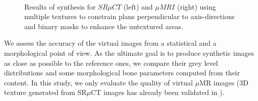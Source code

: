 \documentclass{article}
\begin{document}
\begin{figure}
 \vspace{-0.2cm}
 \centering
 \\
 \caption{Results of synthesis for $SR \mu{CT}$ (left) and $\mu{MRI}$ (right) using multiple textures to constrain plans perpendicular to axis-directions and binary masks to enhance the untextured areas.
         }
 \label{fig:ResultVolumes}
 \vspace{-0.1cm}
\end{figure}

We assess the accuracy of the virtual images from a statistical and a morphological point of view. As the ultimate goal is to produce synthetic images as close as possible 
to the reference ones, we compare their grey level distributions and some morphological bone parameters computed from their content. 
In this study, we only evaluate the quality of virtual $\mu$MR images (3D texture generated from SR$\mu$CT images has already been validated in  \cite{prieto2012}).
\end{document}
